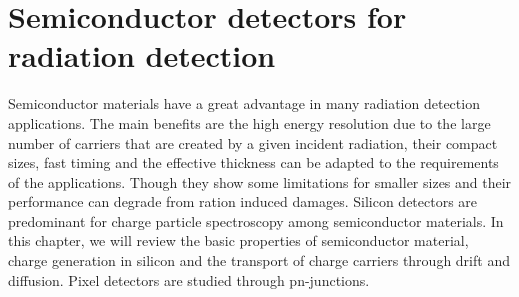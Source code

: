 \chapter{Semiconductor detectors for radiation detection}
\label{sec:SiliconTheory}
Semiconductor materials have a great advantage in many radiation
detection applications. The main benefits are the high energy
resolution due to the large number of carriers that are created by a
given incident radiation, their compact sizes, fast timing and the
effective thickness can be adapted to the requirements of the
applications. Though they show some limitations for smaller sizes and
their performance can degrade from ration induced damages. Silicon
detectors are predominant for charge particle spectroscopy among
semiconductor materials. 
In this chapter, we will review the basic properties of semiconductor
material, charge generation in silicon and the transport of charge
carriers through drift and diffusion. Pixel detectors are studied
through pn-junctions. 

